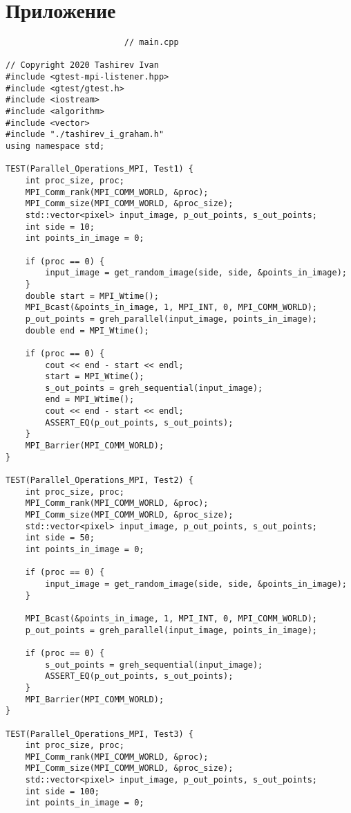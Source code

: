 \documentclass{report}
\begin{document}
\section*{Приложение}
\begin{lstlisting}
						// main.cpp

// Copyright 2020 Tashirev Ivan
#include <gtest-mpi-listener.hpp>
#include <gtest/gtest.h>
#include <iostream>
#include <algorithm>
#include <vector>
#include "./tashirev_i_graham.h"
using namespace std;

TEST(Parallel_Operations_MPI, Test1) {
    int proc_size, proc;
    MPI_Comm_rank(MPI_COMM_WORLD, &proc);
    MPI_Comm_size(MPI_COMM_WORLD, &proc_size);
    std::vector<pixel> input_image, p_out_points, s_out_points;
    int side = 10;
    int points_in_image = 0;

    if (proc == 0) {
        input_image = get_random_image(side, side, &points_in_image);
    }
    double start = MPI_Wtime();
    MPI_Bcast(&points_in_image, 1, MPI_INT, 0, MPI_COMM_WORLD);
    p_out_points = greh_parallel(input_image, points_in_image);
    double end = MPI_Wtime();

    if (proc == 0) {
        cout << end - start << endl;
        start = MPI_Wtime();
        s_out_points = greh_sequential(input_image);
        end = MPI_Wtime();
        cout << end - start << endl;
        ASSERT_EQ(p_out_points, s_out_points);
    }
    MPI_Barrier(MPI_COMM_WORLD);
}

TEST(Parallel_Operations_MPI, Test2) {
    int proc_size, proc;
    MPI_Comm_rank(MPI_COMM_WORLD, &proc);
    MPI_Comm_size(MPI_COMM_WORLD, &proc_size);
    std::vector<pixel> input_image, p_out_points, s_out_points;
    int side = 50;
    int points_in_image = 0;

    if (proc == 0) {
        input_image = get_random_image(side, side, &points_in_image);
    }

    MPI_Bcast(&points_in_image, 1, MPI_INT, 0, MPI_COMM_WORLD);
    p_out_points = greh_parallel(input_image, points_in_image);

    if (proc == 0) {
        s_out_points = greh_sequential(input_image);
        ASSERT_EQ(p_out_points, s_out_points);
    }
    MPI_Barrier(MPI_COMM_WORLD);
}

TEST(Parallel_Operations_MPI, Test3) {
    int proc_size, proc;
    MPI_Comm_rank(MPI_COMM_WORLD, &proc);
    MPI_Comm_size(MPI_COMM_WORLD, &proc_size);
    std::vector<pixel> input_image, p_out_points, s_out_points;
    int side = 100;
    int points_in_image = 0;


\end{lstlisting}
\end{document}
